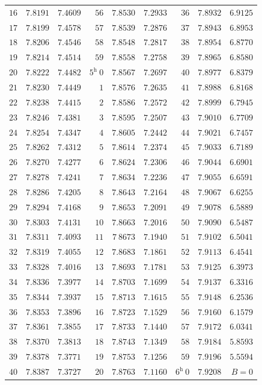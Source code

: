 \begin{center}
\begin{tabular}{r|r|r||r|r|r||r|r|r}
$16$ & $7.8191$ & $7.4609$ & $56$ & $7.8530$ & $7.2933$ & $36$ & $7.8932$ & $6.9125$\\
$17$ & $7.8199$ & $7.4578$ & $57$ & $7.8539$ & $7.2876$ & $37$ & $7.8943$ & $6.8953$\\
$18$ & $7.8206$ & $7.4546$ & $58$ & $7.8548$ & $7.2817$ & $38$ & $7.8954$ & $6.8770$\\
$19$ & $7.8214$ & $7.4514$ & $59$ & $7.8558$ & $7.2758$ & $39$ & $7.8965$ & $6.8580$\\
$20$ & $7.8222$ & $7.4482$ & $5^{\mathrm h}\ 0$ & $7.8567$ & $7.2697$ & $40$ & $7.8977$ & $6.8379$\\
$21$ & $7.8230$ & $7.4449$ & $1$ & $7.8576$ & $7.2635$ & $41$ & $7.8988$ & $6.8168$\\
$22$ & $7.8238$ & $7.4415$ & $2$ & $7.8586$ & $7.2572$ & $42$ & $7.8999$ & $6.7945$\\
$23$ & $7.8246$ & $7.4381$ & $3$ & $7.8595$ & $7.2507$ & $43$ & $7.9010$ & $6.7709$\\
$24$ & $7.8254$ & $7.4347$ & $4$ & $7.8605$ & $7.2442$ & $44$ & $7.9021$ & $6.7457$\\
$25$ & $7.8262$ & $7.4312$ & $5$ & $7.8614$ & $7.2374$ & $45$ & $7.9033$ & $6.7189$\\
$26$ & $7.8270$ & $7.4277$ & $6$ & $7.8624$ & $7.2306$ & $46$ & $7.9044$ & $6.6901$\\
$27$ & $7.8278$ & $7.4241$ & $7$ & $7.8634$ & $7.2236$ & $47$ & $7.9055$ & $6.6591$\\
$28$ & $7.8286$ & $7.4205$ & $8$ & $7.8643$ & $7.2164$ & $48$ & $7.9067$ & $6.6255$\\
$29$ & $7.8294$ & $7.4168$ & $9$ & $7.8653$ & $7.2091$ & $49$ & $7.9078$ & $6.5889$\\
$30$ & $7.8303$ & $7.4131$ & $10$ & $7.8663$ & $7.2016$ & $50$ & $7.9090$ & $6.5487$\\
$31$ & $7.8311$ & $7.4093$ & $11$ & $7\ 8673$ & $7.1940$ & $51$ & $7.9102$ & $6.5041$\\
$32$ & $7.8319$ & $7.4055$ & $12$ & $7.8683$ & $7.1861$ & $52$ & $7.9113$ & $6.4541$\\
$33$ & $7.8328$ & $7.4016$ & $13$ & $7.8693$ & $7.1781$ & $53$ & $7.9125$ & $6.3973$\\
$34$ & $7.8336$ & $7.3977$ & $14$ & $7.8703$ & $7.1699$ & $54$ & $7.9137$ & $6.3316$\\
$35$ & $7.8344$ & $7.3937$ & $15$ & $7.8713$ & $7.1615$ & $55$ & $7.9148$ & $6.2536$\\
$36$ & $7.8353$ & $7.3896$ & $16$ & $7.8723$ & $7.1529$ & $56$ & $7.9160$ & $6.1579$\\
$37$ & $7.8361$ & $7.3855$ & $17$ & $7.8733$ & $7.1440$ & $57$ & $7.9172$ & $6.0341$\\
$38$ & $7.8370$ & $7.3813$ & $18$ & $7.8743$ & $7.1349$ & $58$ & $7.9184$ & $5.8593$\\
$39$ & $7.8378$ & $7.3771$ & $19$ & $7.8753$ & $7.1256$ & $59$ & $7.9196$ & $5.5594$\\
$40$ & $7.8387$ & $7.3727$ & $20$ & $7.8763$ & $7.1160$ & $6^{\mathrm h}\ 0$ & $7.9208$ & $B=0$\\
\end{tabular}


\endgroup
\end{center}
